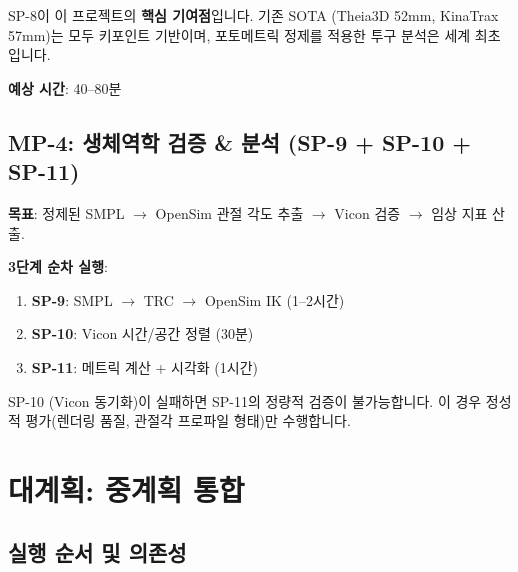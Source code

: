 \documentclass[11pt, a4paper]{report}
\begin{document}
\begin{importantnote}
SP-8이 이 프로젝트의 \textbf{핵심 기여점}입니다. 기존 SOTA (Theia3D 52mm, KinaTrax 57mm)는 모두 키포인트 기반이며, 포토메트릭 정제를 적용한 투구 분석은 세계 최초입니다.
\end{importantnote}

\textbf{예상 시간}: 40--80분


\section{MP-4: 생체역학 검증 \& 분석 (SP-9 + SP-10 + SP-11)}

\begin{keyidea}
\textbf{목표}: 정제된 SMPL $\to$ OpenSim 관절 각도 추출 $\to$ Vicon 검증 $\to$ 임상 지표 산출.
\end{keyidea}

\textbf{3단계 순차 실행}:
\begin{enumerate}
\item \textbf{SP-9}: SMPL $\to$ TRC $\to$ OpenSim IK (1--2시간)
\item \textbf{SP-10}: Vicon 시간/공간 정렬 (30분)
\item \textbf{SP-11}: 메트릭 계산 + 시각화 (1시간)
\end{enumerate}

\begin{warningbox}
SP-10 (Vicon 동기화)이 실패하면 SP-11의 정량적 검증이 불가능합니다. 이 경우 정성적 평가(렌더링 품질, 관절각 프로파일 형태)만 수행합니다.
\end{warningbox}


\chapter{대계획: 중계획 통합}

\section{실행 순서 및 의존성}
\end{document}
